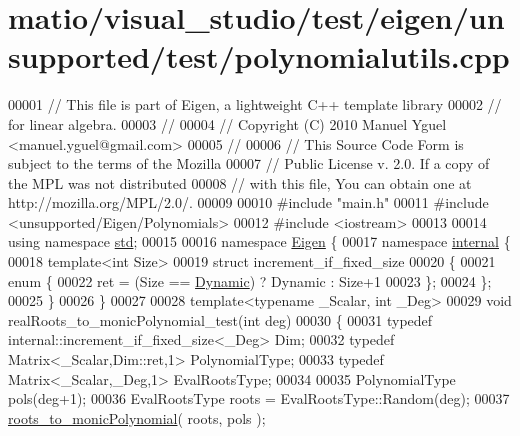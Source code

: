 \hypertarget{matio_2visual__studio_2test_2eigen_2unsupported_2test_2polynomialutils_8cpp_source}{}\section{matio/visual\+\_\+studio/test/eigen/unsupported/test/polynomialutils.cpp}
\label{matio_2visual__studio_2test_2eigen_2unsupported_2test_2polynomialutils_8cpp_source}

\begin{DoxyCode}
00001 \textcolor{comment}{// This file is part of Eigen, a lightweight C++ template library}
00002 \textcolor{comment}{// for linear algebra.}
00003 \textcolor{comment}{//}
00004 \textcolor{comment}{// Copyright (C) 2010 Manuel Yguel <manuel.yguel@gmail.com>}
00005 \textcolor{comment}{//}
00006 \textcolor{comment}{// This Source Code Form is subject to the terms of the Mozilla}
00007 \textcolor{comment}{// Public License v. 2.0. If a copy of the MPL was not distributed}
00008 \textcolor{comment}{// with this file, You can obtain one at http://mozilla.org/MPL/2.0/.}
00009 
00010 \textcolor{preprocessor}{#include "main.h"}
00011 \textcolor{preprocessor}{#include <unsupported/Eigen/Polynomials>}
00012 \textcolor{preprocessor}{#include <iostream>}
00013 
00014 \textcolor{keyword}{using namespace }\hyperlink{namespacestd}{std};
00015 
00016 \textcolor{keyword}{namespace }\hyperlink{namespace_eigen}{Eigen} \{
00017 \textcolor{keyword}{namespace }\hyperlink{namespaceinternal}{internal} \{
00018 \textcolor{keyword}{template}<\textcolor{keywordtype}{int} Size>
00019 \textcolor{keyword}{struct }increment\_if\_fixed\_size
00020 \{
00021   \textcolor{keyword}{enum} \{
00022     ret = (Size == \hyperlink{namespace_eigen_ad81fa7195215a0ce30017dfac309f0b2}{Dynamic}) ? Dynamic : Size+1
00023   \};
00024 \};
00025 \}
00026 \}
00027 
00028 \textcolor{keyword}{template}<\textcolor{keyword}{typename} \_Scalar, \textcolor{keywordtype}{int} \_Deg>
00029 \textcolor{keywordtype}{void} realRoots\_to\_monicPolynomial\_test(\textcolor{keywordtype}{int} deg)
00030 \{
00031   \textcolor{keyword}{typedef} internal::increment\_if\_fixed\_size<\_Deg>            Dim;
00032   \textcolor{keyword}{typedef} Matrix<\_Scalar,Dim::ret,1>                  PolynomialType;
00033   \textcolor{keyword}{typedef} Matrix<\_Scalar,\_Deg,1>                      EvalRootsType;
00034 
00035   PolynomialType pols(deg+1);
00036   EvalRootsType roots = EvalRootsType::Random(deg);
00037   \hyperlink{namespace_eigen_afbc3648f7ef67db3d5d04454fc1257fd}{roots\_to\_monicPolynomial}( roots, pols );

\end{DoxyCode}
